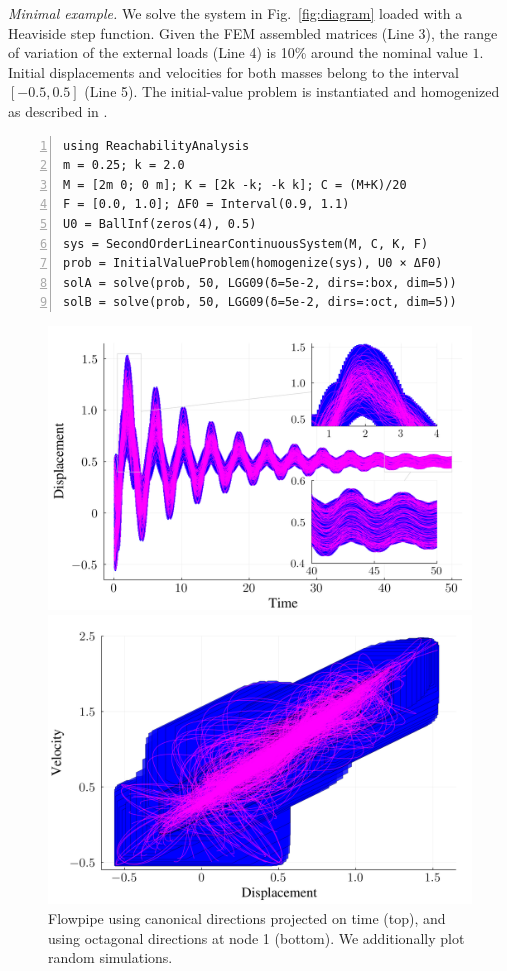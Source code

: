 \documentclass{juliacon}
\begin{document}
\noindent \emph{Minimal example.} We solve the system in Fig.~\ref{fig:diagram} loaded with a Heaviside step function.
%
Given the FEM assembled matrices (Line 3), the range of variation of the external loads (Line 4) is 10\% around the nominal value $1$.
%
Initial displacements and velocities for both masses belong to the interval $[-0.5, 0.5]$ (Line 5).
%
The initial-value problem is instantiated and homogenized as described in \cite{forets2021combining}.

\begin{lstlisting}[label=ejemplo, numbers=left, aboveskip=-0.2cm, belowskip=0.8mm]
using ReachabilityAnalysis
m = 0.25; k = 2.0
M = [2m 0; 0 m]; K = [2k -k; -k k]; C = (M+K)/20
F = [0.0, 1.0]; ΔF0 = Interval(0.9, 1.1)
U0 = BallInf(zeros(4), 0.5)
sys = SecondOrderLinearContinuousSystem(M, C, K, F)
prob = InitialValueProblem(homogenize(sys), U0 × ΔF0)
solA = solve(prob, 50, LGG09(δ=5e-2, dirs=:box, dim=5))
solB = solve(prob, 50, LGG09(δ=5e-2, dirs=:oct, dim=5))
\end{lstlisting}

\begin{figure}[tb!]
	\centering
	\includegraphics[width=0.8\linewidth,keepaspectratio]{example/displacement_vs_time}
	
	\includegraphics[width=0.8\linewidth,keepaspectratio]{example/velocity_vs_displacement}
	\caption{Flowpipe using canonical directions projected on time (top), and using octagonal directions at node 1 (bottom). We additionally plot random simulations.}
	\label{fig:example}
\end{figure}
\end{document}
